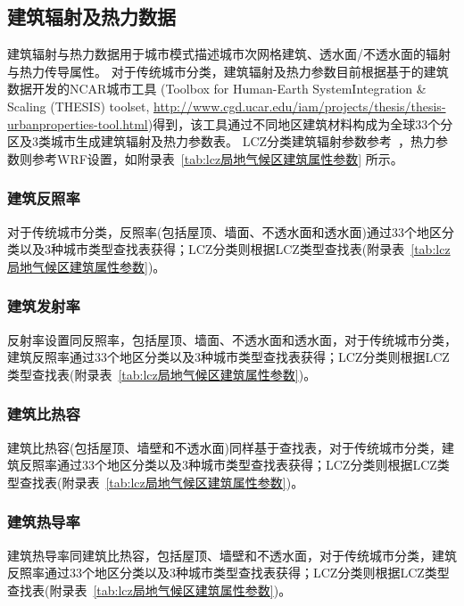 \subsection{建筑辐射及热力数据}\label{建筑辐射及热力数据}
建筑辐射与热力数据用于城市模式描述城市次网格建筑、透水面/不透水面的辐射与热力传导属性。
对于传统城市分类，建筑辐射及热力参数目前根据\citet{oleson2020parameterization}基于\citet{jackson2010parameterization}的建筑数据开发的NCAR城市工具
(Toolbox for Human-Earth SystemIntegration \& Scaling (THESIS) toolset, \url{http://www.cgd.ucar.edu/iam/projects/thesis/thesis-urbanproperties-tool.html})得到，该工具通过不同地区建筑材料构成为全球33个分区及3类城市生成建筑辐射及热力参数表。
LCZ分类建筑辐射参数参考~\citet{stewart2014evaluation}，热力参数则参考WRF设置，如附录表~\ref{tab:lcz局地气候区建筑属性参数} 所示。

\subsubsection{建筑反照率}\label{建筑反照率}
对于传统城市分类，反照率(包括屋顶、墙面、不透水面和透水面)通过33个地区分类以及3种城市类型查找表获得；LCZ分类则根据LCZ类型查找表(附录表~\ref{tab:lcz局地气候区建筑属性参数})。

\subsubsection{建筑发射率}\label{建筑发射率}
反射率设置同反照率，包括屋顶、墙面、不透水面和透水面，对于传统城市分类，建筑反照率通过33个地区分类以及3种城市类型查找表获得；LCZ分类则根据LCZ类型查找表(附录表~\ref{tab:lcz局地气候区建筑属性参数})。

\subsubsection{建筑比热容}\label{建筑比热容}
建筑比热容(包括屋顶、墙壁和不透水面)同样基于查找表，对于传统城市分类，建筑反照率通过33个地区分类以及3种城市类型查找表获得；LCZ分类则根据LCZ类型查找表(附录表~\ref{tab:lcz局地气候区建筑属性参数})。

\subsubsection{建筑热导率}\label{建筑热导率}
建筑热导率同建筑比热容，包括屋顶、墙壁和不透水面，对于传统城市分类，建筑反照率通过33个地区分类以及3种城市类型查找表获得；LCZ分类则根据LCZ类型查找表(附录表~\ref{tab:lcz局地气候区建筑属性参数})。

